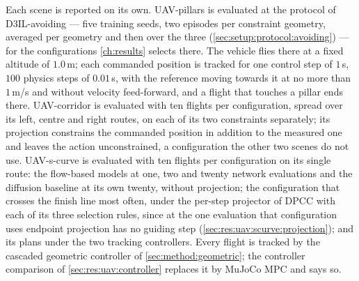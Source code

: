 Each scene is reported on its own. UAV-pillars is evaluated at the protocol of D3IL-avoiding --- five
training seeds, two episodes per constraint geometry, averaged per geometry and then over the three
(\autoref{sec:setup:protocol:avoiding}) --- for the configurations \autoref{ch:results} selects there.
The vehicle flies there at a fixed altitude of $1.0$\,m; each commanded position is tracked for one
control step of $1$\,s, $100$ physics steps of $0.01$\,s, with the reference moving towards it at no more
than $1$\,m/s and without velocity feed-forward, and a flight that touches a pillar ends there. UAV-corridor is evaluated with ten flights per configuration, spread
over its left, centre and right routes, on each of its two constraints separately; its projection constrains the commanded position in addition to the measured one and leaves the
action unconstrained, a configuration the other two scenes do not use. UAV-s-curve is evaluated with ten
flights per configuration on its single route: the flow-based models at one, two and twenty network
evaluations and the diffusion baseline at its own twenty, without projection; the configuration that
crosses the finish line most often, under the per-step projector of \ac{DPCC} with each of its three
selection rules, since at the one evaluation that configuration uses endpoint projection has no guiding
step (\autoref{sec:res:uav:scurve:projection}); and its plans under the two tracking controllers. Every flight is tracked by the cascaded geometric
controller of \autoref{sec:method:geometric}; the controller comparison of
\autoref{sec:res:uav:controller} replaces it by MuJoCo MPC and says so.
